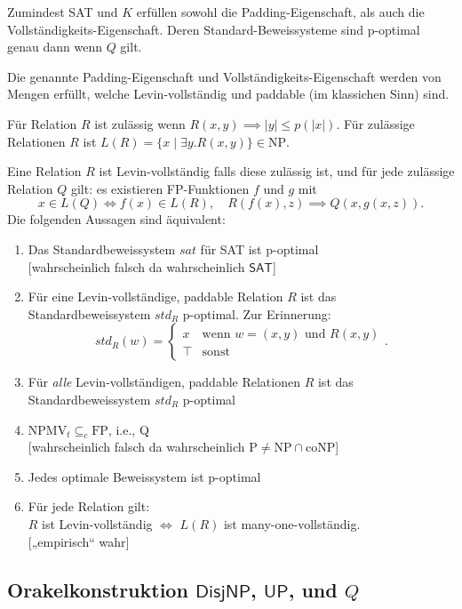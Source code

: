 \documentclass[nofonts]{uebung}
\def\hUP{\ensuremath{\mathsf{UP}}}
\def\hDisjNP{\ensuremath{\mathsf{DisjNP}}}
\begin{document}
\noindent
Zumindest SAT und $K$ erfüllen sowohl die Padding-Eigenschaft, als auch die Vollständigkeits-Eigenschaft.
Deren Standard-Beweissysteme sind p-optimal genau dann wenn $Q$ gilt.

Die genannte Padding-Eigenschaft und Vollständigkeits-Eigenschaft werden von Mengen erfüllt, welche Levin-vollständig und paddable (im klassichen Sinn) sind.
\clearpage

Für Relation $R$ ist zulässig wenn $R(x,y)\implies |y|\leq p(|x|)$. Für zulässige Relationen $R$ ist $L(R)=\{x\mid\exists y. R(x,y)\}\in\mathrm{NP}$.

Eine Relation $R$ ist Levin-vollständig falls diese zulässig ist,
und für jede zulässige Relation $Q$ gilt: es existieren FP-Funktionen $f$ und $g$ mit
\[ x\in L(Q) \iff f(x)\in L(R), \quad R(f(x),z) \implies Q(x, g(x,z)). \]
Die folgenden Aussagen sind äquivalent:
\begin{enumerate}
    \item Das Standardbeweissystem $sat$ für SAT ist p-optimal\\
        {}[wahrscheinlich falsch da wahrscheinlich $\mathsf{SAT}$]
    \item Für eine Levin-vollständige, paddable Relation $R$ ist das Standardbeweissystem $std_R$ p-optimal. Zur Erinnerung:
        \[ \mathit{std}_R(w) = \begin{cases} x & \text{wenn $w=(x,y)$ und $R(x,y)$}\\
        \top & \text{sonst}\end{cases}. \] 
    \item Für \emph{alle} Levin-vollständigen, paddable Relationen $R$ ist das Standardbeweissystem $std_R$ p-optimal
    \item $\mathrm{NPMV}_t\subseteq_c \mathrm{FP}$, i.e., Q\\
        {}[wahrscheinlich falsch da wahrscheinlich $\mathrm{P}\neq\mathrm{NP}\cap\mathrm{coNP}$]
    \item Jedes optimale Beweissystem ist p-optimal
    \item Für jede Relation gilt:\\ $R$ ist Levin-vollständig $\iff$ $L(R)$ ist many-one-vollständig.\\
        {}[„empirisch“ wahr]
\end{enumerate}
\clearpage


\subsection*{Orakelkonstruktion $\hDisjNP$, $\hUP$, und $Q$}
\end{document}
